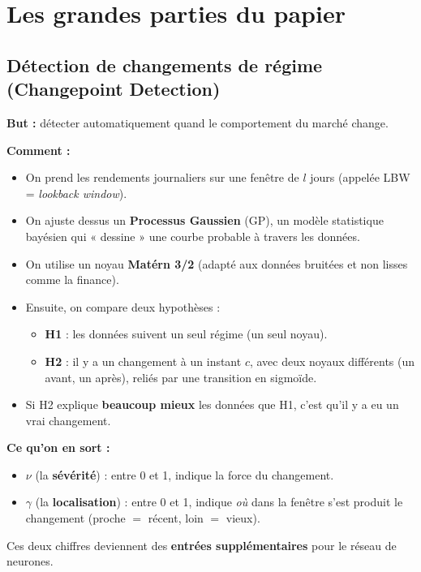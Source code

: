 \documentclass[11pt,a4paper]{article}
\begin{document}
\section{Les grandes parties du papier}

\subsection{Détection de changements de régime (Changepoint Detection)}

\textbf{But :} détecter automatiquement quand le comportement du marché change.

\textbf{Comment :}
\begin{itemize}[leftmargin=*]
    \item On prend les rendements journaliers sur une fenêtre de $l$ jours (appelée LBW = \emph{lookback window}).
    \item On ajuste dessus un \textbf{Processus Gaussien} (GP), un modèle statistique bayésien qui « dessine » une courbe probable à travers les données.
    \item On utilise un noyau \textbf{Matérn 3/2} (adapté aux données bruitées et non lisses comme la finance).
    \item Ensuite, on compare deux hypothèses :
    \begin{itemize}
        \item \textbf{H1} : les données suivent un seul régime (un seul noyau).
        \item \textbf{H2} : il y a un changement à un instant $c$, avec deux noyaux différents (un avant, un après), reliés par une transition en sigmoïde.
    \end{itemize}
    \item Si H2 explique \textbf{beaucoup mieux} les données que H1, c'est qu'il y a eu un vrai changement.
\end{itemize}

\textbf{Ce qu'on en sort :}
\begin{itemize}[leftmargin=*]
    \item $\nu$ (la \textbf{sévérité}) : entre 0 et 1, indique la force du changement.
    \item $\gamma$ (la \textbf{localisation}) : entre 0 et 1, indique \emph{où} dans la fenêtre s'est produit le changement (proche $=$ récent, loin $=$ vieux).
\end{itemize}

Ces deux chiffres deviennent des \textbf{entrées supplémentaires} pour le réseau de neurones.
\end{document}
